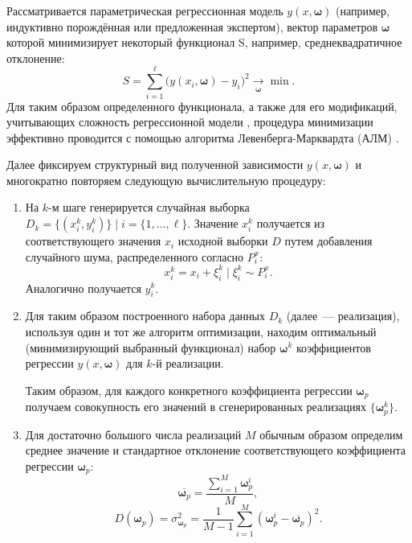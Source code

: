 \documentclass[11pt,a4paper]{article}
\theoremstyle{definition}
\begin{document}
Рассматривается параметрическая регрессионная модель $y(x, \boldsymbol{\omega})$
(например, индуктивно порождённая \cite{Rudoy13} или предложенная экспертом),
вектор параметров $\boldsymbol{\omega}$ которой минимизирует некоторый функционал S,
например, среднеквадратичное отклонение:
\begin{equation}
  S = \sum_{i=1}^\ell \big(y (x_i, \boldsymbol{\omega}) - y_i\big)^2 \underset{\boldsymbol{\omega}}{\rightarrow} \min.
  \label{eq:S}
\end{equation}
Для таким образом определенного функционала, а также для его модификаций,
учитывающих сложность регрессионной модели \cite{Rudoy13}, процедура минимизации эффективно
проводится с помощью алгоритма Левенберга-Марквардта (АЛМ) \cite{Marquardt1963Algorithm,more:78}.

Далее фиксируем структурный вид полученной зависимости $y(x, \boldsymbol{\omega})$ и
многократно повторяем следующую вычислительную процедуру:
\begin{enumerate}
  \item На $k$-м шаге генерируется случайная выборка
	$D_k = \{ (x_i^k, y_i^k) \} \mid i = \{ 1, \dots, \ell \}$. Значение $x_i^k$
	получается из соответствующего значения $x_i$ исходной
	выборки $D$ путем добавления случайного шума, распределенного согласно
	$P_i^x$:
	\[
	  x_i^k = x_i + \xi_i^k \mid \xi_i^k \sim P_i^x.
	\]
	Аналогично получается $y_i^k$.
  \item Для таким образом построенного набора данных $D_k$
	(далее~--- реализация), используя один и тот же
    алгоритм оптимизации, находим оптимальный (минимизирующий выбранный
	функционал) набор $\boldsymbol{\omega}^k$ коэффициентов регрессии
	$y(x, \boldsymbol{\omega})$ для $k$-й реализации.

	Таким образом, для каждого конкретного коэффициента регрессии
	$\boldsymbol{\omega}_p$ получаем совокупность его значений в сгенерированных реализациях
	$\{ \boldsymbol{\omega}_p^k \}$.
  \item Для достаточно большого числа реализаций $M$ обычным образом определим
	  среднее значение и стандартное отклонение соответствующего
	  коэффициента регрессии $\boldsymbol{\omega}_p$:
	  \begin{equation}
		\label{eq:omega_mean}
		\overline{\boldsymbol{\omega}_p} = \frac{\sum_{i = 1}^M \boldsymbol{\omega}_p^i}{M},
	  \end{equation}
	  \begin{equation}
		\label{eq:omega_stddev}
		D(\boldsymbol{\omega}_p) = \sigma_{\boldsymbol{\omega}_p}^2 = \frac{1}{M - 1} \sum_{i = 1}^M (\boldsymbol{\omega}_p^i - \overline{\boldsymbol{\omega}_p})^2.
	  \end{equation}
\end{enumerate}
\end{document}
